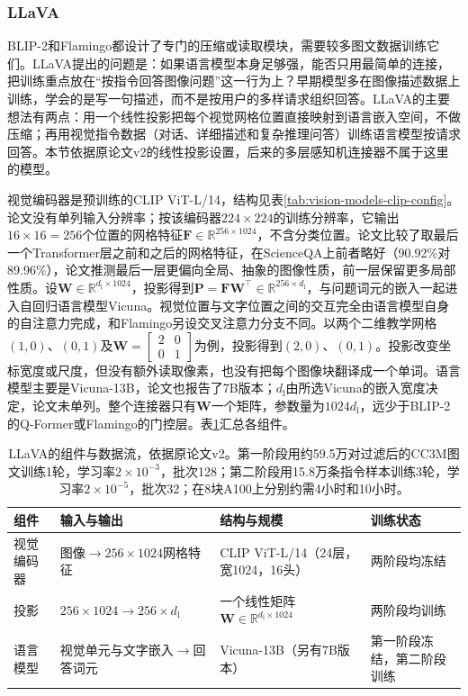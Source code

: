 \subsubsection{LLaVA}
\label{sec:vision-models-llava}

BLIP-2和Flamingo都设计了专门的压缩或读取模块，需要较多图文数据训练它们。LLaVA提出的问题是：如果语言模型本身足够强，能否只用最简单的连接，把训练重点放在“按指令回答图像问题”这一行为上？早期模型多在图像描述数据上训练，学会的是写一句描述，而不是按用户的多样请求组织回答。LLaVA的主要想法有两点：用一个线性投影把每个视觉网格位置直接映射到语言嵌入空间，不做压缩；再用视觉指令数据（对话、详细描述和复杂推理问答）训练语言模型按请求回答。本节依据原论文v2的线性投影设置，后来的多层感知机连接器不属于这里的模型。

视觉编码器是预训练的CLIP ViT-L/14，结构见表\ref{tab:vision-models-clip-config}。论文没有单列输入分辨率；按该编码器$224\times224$的训练分辨率，它输出$16\times16=256$个位置的网格特征$\bm F\in\mathbb R^{256\times1024}$，不含分类位置。论文比较了取最后一个Transformer层之前和之后的网格特征，在ScienceQA上前者略好（90.92\%对89.96\%），论文推测最后一层更偏向全局、抽象的图像性质，前一层保留更多局部性质。设$\bm W\in\mathbb R^{d_{\mathrm l}\times1024}$，投影得到$\bm P=\bm F\bm W^\top\in\mathbb R^{256\times d_{\mathrm l}}$，与问题词元的嵌入一起进入自回归语言模型Vicuna。视觉位置与文字位置之间的交互完全由语言模型自身的自注意力完成，和Flamingo另设交叉注意力分支不同。以两个二维教学网格$(1,0)$、$(0,1)$及$\bm W=\left[\begin{smallmatrix}2&0\\0&1\end{smallmatrix}\right]$为例，投影得到$(2,0)$、$(0,1)$。投影改变坐标宽度或尺度，但没有额外读取像素，也没有把每个图像块翻译成一个单词。语言模型主要是Vicuna-13B，论文也报告了7B版本；$d_{\mathrm l}$由所选Vicuna的嵌入宽度决定，论文未单列。整个连接器只有$\bm W$一个矩阵，参数量为$1024d_{\mathrm l}$，远少于BLIP-2的Q-Former或Flamingo的门控层。表\ref{tab:vision-models-llava-config}汇总各组件。

\begin{table}[htbp]
  \centering
  \small
  \begin{tabularx}{\linewidth}{@{}p{14mm}XXp{18mm}@{}}
    \toprule
    组件 & 输入与输出 & 结构与规模 & 训练状态\\
    \midrule
    视觉编码器 & 图像$\to256\times1024$网格特征 & CLIP ViT-L/14（24层，宽1024，16头） & 两阶段均冻结\\
    投影 & $256\times1024\to256\times d_{\mathrm l}$ & 一个线性矩阵$\bm W\in\mathbb R^{d_{\mathrm l}\times1024}$ & 两阶段均训练\\
    语言模型 & 视觉单元与文字嵌入$\to$回答词元 & Vicuna-13B（另有7B版本） & 第一阶段冻结，第二阶段训练\\
    \bottomrule
  \end{tabularx}
  \caption{LLaVA的组件与数据流，依据原论文v2。第一阶段用约59.5万对过滤后的CC3M图文训练1轮，学习率$2\times10^{-3}$，批次128；第二阶段用15.8万条指令样本训练3轮，学习率$2\times10^{-5}$，批次32；在8块A100上分别约需4小时和10小时。}
  \label{tab:vision-models-llava-config}
\end{table}

